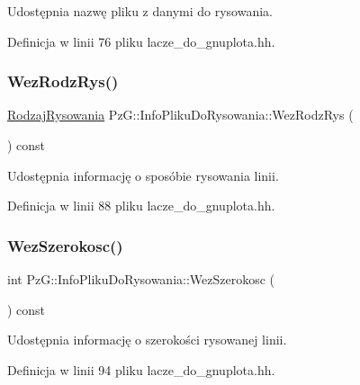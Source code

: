 Udostępnia nazwę pliku z danymi do rysowania. 

Definicja w linii 76 pliku lacze\+\_\+do\+\_\+gnuplota.\+hh.

\mbox{\label{class_pz_g_1_1_info_pliku_do_rysowania_a6a46f3c7b7a08dfa9d694f387f873234}} 
\subsubsection{\texorpdfstring{WezRodzRys()}{WezRodzRys()}}
{\footnotesize\ttfamily \mbox{\hyperlink{namespace_pz_g_a705c92106f39b7d0c34a6739d10ff0b6}{Rodzaj\+Rysowania}} Pz\+G\+::\+Info\+Pliku\+Do\+Rysowania\+::\+Wez\+Rodz\+Rys (\begin{DoxyParamCaption}{ }\end{DoxyParamCaption}) const\hspace{0.3cm}{\ttfamily [inline]}}

Udostępnia informację o sposóbie rysowania linii. 

Definicja w linii 88 pliku lacze\+\_\+do\+\_\+gnuplota.\+hh.

\mbox{\label{class_pz_g_1_1_info_pliku_do_rysowania_a627bb615c50f3b03374774e6b974488b}} 
\subsubsection{\texorpdfstring{WezSzerokosc()}{WezSzerokosc()}}
{\footnotesize\ttfamily int Pz\+G\+::\+Info\+Pliku\+Do\+Rysowania\+::\+Wez\+Szerokosc (\begin{DoxyParamCaption}{ }\end{DoxyParamCaption}) const\hspace{0.3cm}{\ttfamily [inline]}}

Udostępnia informację o szerokości rysowanej linii. 

Definicja w linii 94 pliku lacze\+\_\+do\+\_\+gnuplota.\+hh.

\mbox{\label{class_pz_g_1_1_info_pliku_do_rysowania_ae734c69f5cecf9c0584e3a7f433340ea}} 
